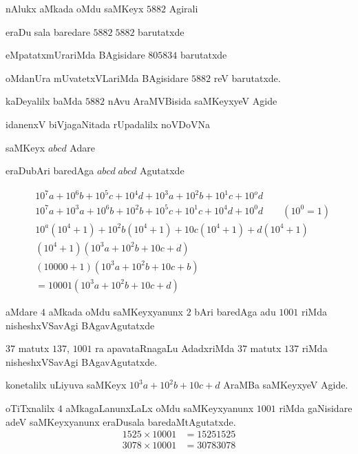 nAlukx aMkada oMdu saMKeyx $5882$ Agirali

eraDu sala baredare $5882\; 5882$ barutatxde

eMpatatxmUrariMda BAgisidare $805834$ barutatxde

oMdanUra mUvatetxVLariMda BAgisidare $5882$ reV barutatxde.

kaDeyalilx baMda $5882$ nAvu AraMVBisida saMKeyxyeV Agide

idanenxV biVjagaNitada rUpadalilx noVDoVNa

saMKeyx $abcd$ Adare

eraDubAri baredAga $abcd\;abcd$ Agutatxde

\begin{align*}
& 10^{7}a + 10^{6}b +10^{5}c +10^{4}d + 10^{3}a + 10^{2}b +10^{1}c +10^{o}d\\
& 10^{7}a +10^{3}a +10^{6}b +10^{2}b + 10^{5}c +10^{1}c + 10^{4}d +10^{0}d \qquad\text{$\left(10^0 =1\right)$}\\
& 10^a\left(10^4 +1\right) +10^{2}b\left(10^4 +1\right) + 10c\left(10^4 +1\right) +d \left(10^4+ 1\right)\\
&\left(10^4 +1\right) \left(10^{3}a + 10^{2}b +10c + d\right)\\
&(10000+1)\left(10^{3}a + 10^{2}b+10c+b\right)\\
&=10001\left(10^{3}a + 10^{2}b +10c +d\right)
 \end{align*}
 
aMdare $4$ aMkada oMdu saMKeyxyanunx $2$ bAri baredAga adu $1001$ riMda nisheshxVSavAgi BAgavAgutatxde

$37$ matutx $137$, $1001$ ra apavataRnagaLu AdadxriMda $37$ matutx $137$ riMda \-nisheshxVSavAgi BAgavAgutatxde.

konetalilx uLiyuva saMKeyx $10^{3}a+10^{2}b+10c+d$ AraMBa saMKeyxyeV Agide.

oTiTxnalilx $4$ aMkagaLanunxLaLx oMdu saMKeyxyanunx $1001$ riMda gaNisidare adeV saMKeyxyanunx eraDusala baredaMtAgutatxde. 
\begin{align*}
1525\times 10001 &= 15251525\\
3078 \times 10001 &= 30783078
\end{align*}
